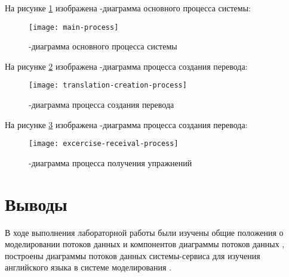 \documentclass[a4paper,14pt]{extarticle}
\begin{document}
На рисунке \ref{fig:main-process} изображена -диаграмма основного
процесса системы:

\begin{figure}[H]
    \centering
    \texttt{[image: main-process]}
    \caption{-диаграмма основного процесса системы}
    \label{fig:main-process}
\end{figure}

На рисунке \ref{fig:translation-creation-process} изображена
-диаграмма процесса создания перевода:

\begin{figure}[H]
    \centering
    \texttt{[image: translation-creation-process]}
    \caption{-диаграмма процесса создания перевода}
    \label{fig:translation-creation-process}
\end{figure}

На рисунке \ref{fig:excercise-receival-process} изображена -диаграмма
процесса создания перевода:

\begin{figure}[H]
    \centering
    \texttt{[image: excercise-receival-process]}
    \caption{-диаграмма процесса получения упражнений}
    \label{fig:excercise-receival-process}
\end{figure}

\section*{Выводы}
В ходе выполнения лабораторной работы были изучены общие положения о
моделировании потоков данных и компонентов диаграммы потоков данных ,
построены диаграммы потоков данных системы-сервиса для изучения английского
языка в системе моделирования .
\end{document}
